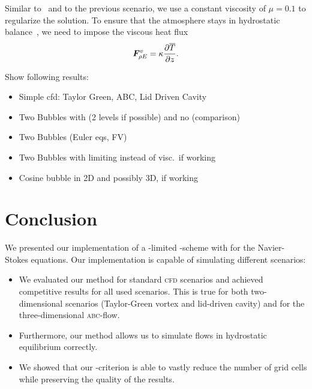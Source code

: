 \documentclass[runningheads]{llncs}
\begin{document}
Similar to~\cite{muller2010adaptive} and to the previous scenario, we use a constant viscosity of $\mu = 0.1$ to regularize the solution.
To ensure that the atmosphere stays in hydrostatic balance~\cite{giraldo2008study}, we need to impose the viscous heat flux
\begin{equation}
  \label{eq:atmosphere-bc}
  \viscFlux_{\QE} = \kappa \pdv{\overline{T}}{z}.%
\end{equation}


Show following results:
\begin{itemize}
\item Simple cfd: Taylor Green, ABC, Lid Driven Cavity
\item Two Bubbles with \amr{} (2 levels if possible) and no \amr{} (comparison)
\item Two Bubbles (Euler eqs, FV)  
\item Two Bubbles with limiting instead of visc.\ if working  
\item Cosine bubble in 2D and possibly 3D, if working 
\end{itemize}

\section{Conclusion}
We presented our implementation of a \muscl{}-limited \aderdg{}-scheme with \amr{} for the Navier-Stokes equations.
Our implementation is capable of simulating different scenarios:
\begin{itemize}
\item We evaluated our method for standard \textsc{cfd} scenarios and achieved competitive results for all used scenarios.
  This is true for both two-dimensional scenarios (Taylor-Green vortex and lid-driven cavity) and for the three-dimensional \textsc{abc}-flow.
\item Furthermore, our method allows us to simulate flows in hydrostatic equilibrium correctly.
\item We showed that our \amr{}-criterion is able to vastly reduce the number of grid cells while preserving the quality of the results.
\end{itemize}
\end{document}
